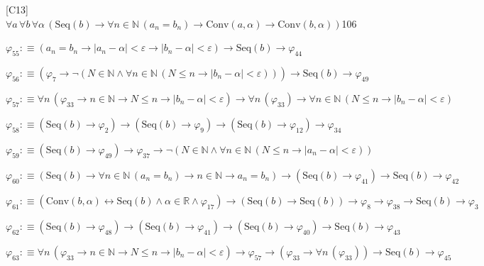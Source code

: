 \begin{fullproof}{[C13]}{$\forall a\,\forall b\,\forall \alpha\,(\mathrm{Seq}(b) \to \forall n \in \mathbb{N}\,(a_{n} = b_{n}) \to \mathrm{Conv}(a,\alpha) \to \mathrm{Conv}(b,\alpha))$}{106}
\begin{abbrevlist}
\item $\varphi_{55} :\equiv (a_{n} = b_{n} \to \lvert a_{n} - \alpha \rvert < \varepsilon \to \lvert b_{n} - \alpha \rvert < \varepsilon) \to \mathrm{Seq}(b) \to \varphi_{44}$
\item $\varphi_{56} :\equiv (\varphi_{7} \to \neg (N \in \mathbb{N} \land \forall n \in \mathbb{N}\,(N \leq n \to \lvert b_{n} - \alpha \rvert < \varepsilon))) \to \mathrm{Seq}(b) \to \varphi_{49}$
\item $\varphi_{57} :\equiv \forall n\,(\varphi_{33} \to n \in \mathbb{N} \to N \leq n \to \lvert b_{n} - \alpha \rvert < \varepsilon) \to \forall n\,(\varphi_{33}) \to \forall n \in \mathbb{N}\,(N \leq n \to \lvert b_{n} - \alpha \rvert < \varepsilon)$
\item $\varphi_{58} :\equiv (\mathrm{Seq}(b) \to \varphi_{2}) \to (\mathrm{Seq}(b) \to \varphi_{9}) \to (\mathrm{Seq}(b) \to \varphi_{12}) \to \varphi_{34}$
\item $\varphi_{59} :\equiv (\mathrm{Seq}(b) \to \varphi_{49}) \to \varphi_{37} \to \neg (N \in \mathbb{N} \land \forall n \in \mathbb{N}\,(N \leq n \to \lvert a_{n} - \alpha \rvert < \varepsilon))$
\item $\varphi_{60} :\equiv (\mathrm{Seq}(b) \to \forall n \in \mathbb{N}\,(a_{n} = b_{n}) \to n \in \mathbb{N} \to a_{n} = b_{n}) \to (\mathrm{Seq}(b) \to \varphi_{41}) \to \mathrm{Seq}(b) \to \varphi_{42}$
\item $\varphi_{61} :\equiv (\mathrm{Conv}(b,\alpha) \leftrightarrow \mathrm{Seq}(b) \land \alpha \in \mathbb{R} \land \varphi_{17}) \to (\mathrm{Seq}(b) \to \mathrm{Seq}(b)) \to \varphi_{8} \to \varphi_{38} \to \mathrm{Seq}(b) \to \varphi_{3}$
\item $\varphi_{62} :\equiv (\mathrm{Seq}(b) \to \varphi_{48}) \to (\mathrm{Seq}(b) \to \varphi_{41}) \to (\mathrm{Seq}(b) \to \varphi_{40}) \to \mathrm{Seq}(b) \to \varphi_{43}$
\item $\varphi_{63} :\equiv \forall n\,(\varphi_{33} \to n \in \mathbb{N} \to N \leq n \to \lvert b_{n} - \alpha \rvert < \varepsilon) \to \varphi_{57} \to (\varphi_{33} \to \forall n\,(\varphi_{33})) \to \mathrm{Seq}(b) \to \varphi_{45}$
\end{abbrevlist}
\end{fullproof}
